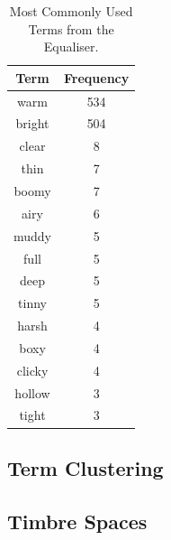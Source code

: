 		\begin{table}[h!]
			\centering
			\begin{tabular}{|c|c|}
				\hline
				\bf{Term} & \bf{Frequency} \\
				\hline
				\hline
				warm & 534 \\
				\hline
				bright & 504 \\
				\hline
				clear & 8 \\
				\hline
				thin & 7 \\
				\hline
				boomy & 7 \\
				\hline
				airy & 6 \\
				\hline
				muddy & 5 \\
				\hline
				full & 5 \\
				\hline
				deep & 5 \\
				\hline
				tinny & 5 \\
				\hline
				harsh & 4 \\
				\hline
				boxy & 4 \\
				\hline
				clicky & 4 \\
				\hline
				hollow & 3 \\
				\hline
				tight & 3 \\
				\hline
			\end{tabular}
			\caption{Most Commonly Used Terms from the Equaliser.}
			\label{tab:EquaiserTerms}
		\end{table}

	\subsection{Term Clustering}
	\label{sec:TimbreEvaluation-Analysis-TermClustering}

	\subsection{Timbre Spaces}
	\label{sec:TImbreEvaluation-Analysis-TimbreSpaces}

